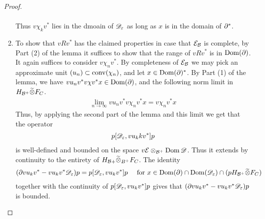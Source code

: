 \begin{proof}
\begin{enumerate}
\begin{align*}
	\end{align*}
	Thus $v\chi_k v^*$ lies in the dmoain of $\mathscr{D}_\varepsilon$ as long as $x$ is in the domain of $\partial^*$. 
	\item
	To show that $vRv^*$ has the claimed properties in case that $\mathcal{E}_{\mathcal{B}}$ is complete, by Part (2) of the lemma it suffices to show that the range of $vRv^*$ is in $\operatorname{Dom} (\partial)$. It again suffices to consider $v\chi_n v^*$. By completeness of $\mathcal{E}_{\mathcal{B}}$ we may pick an approximate unit $(u_n)\subset \operatorname{conv}(\chi_n)$, and let $x\in \operatorname{Dom} (\partial)^*$. By Part (1) of the lemma, we have $v u_nv^*v\chi v^* x\in \operatorname{Dom} (\partial)$, and the following norm limit in $H_{\mathcal{B}^+} \widetilde{\otimes} F_C$. 
	\begin{align*}
		\lim_{n\to\infty} vu_n v^* v\chi_n  v^*x =v\chi_n v^* x
	\end{align*}
	Thus, by applying the second part of the lemma and this limit we get that the operator
	\begin{align*}
		p[\mathscr{D}_\varepsilon,vu_kkv^*]p
	\end{align*}
	is well-defined and bounded on the space $v\mathcal{E} \otimes_{\mathcal{B}^+} \operatorname{Dom} \mathscr{D}$. Thus it extends by continuity to the entirety of $H_{\mathcal{B}+}\widetilde{\otimes}_{B^+} F_C$. The identity 
	\begin{align*}
		(\partial v u_k v^*-vu_k v^* \mathscr{D}_\varepsilon)p=p[\mathscr{D}_\varepsilon,vu_k v^*]p \quad \text{ for } x\in \operatorname{Dom} (\partial) \cap \operatorname{Dom} (\mathscr{D}_\varepsilon) \cap (p H_{\mathcal{B}^+}\widetilde{\otimes} F_C)
	\end{align*}
	together with the continuity of $p[\mathscr{D}_\varepsilon,vu_k v^*]p$ gives that $(\partial v u_k v^*-vu_k v^* \mathscr{D}_\varepsilon)p$ is bounded. 

\end{enumerate}
\end{proof}
